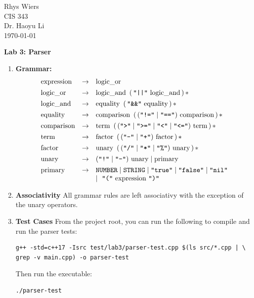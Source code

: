 \documentclass[12pt]{article}
\theoremstyle{definition}
\newcommand{\term}[1]{\texttt{"#1"}}
\newcommand{\nt}[1]{\text{#1}}
\begin{document}
    \noindent
    Rhys Wiers\\
    CIS 343\\
    Dr. Haoyu Li\\
    \today

    \begin{center}
        {\Large \textbf{Lab 3: Parser}}
    \end{center}

    \begin{enumerate}
    \item \textbf{Grammar:}
        \begin{equation*}
        \begin{array}{lcl}
        \nt{expression} & \rightarrow & \nt{logic\_or} \\[4pt]
        \nt{logic\_or}  & \rightarrow & \nt{logic\_and}\ \left(\,\term{\textbar\textbar}\ \nt{logic\_and}\,\right)* \\[4pt]
        \nt{logic\_and} & \rightarrow & \nt{equality}\ \left(\,\term{\&\&}\ \nt{equality}\,\right)* \\[4pt]
        \nt{equality}   & \rightarrow & \nt{comparison}\ \left(\,(\term{!=} \mid \term{==})\ \nt{comparison}\,\right)* \\[4pt]
        \nt{comparison} & \rightarrow & \nt{term}\ \left(\,(\term{>} \mid \term{>=} \mid \term{<} \mid \term{<=})\ \nt{term}\,\right)* \\[4pt]
        \nt{term}       & \rightarrow & \nt{factor}\ \left(\,(\term{-} \mid \term{+})\ \nt{factor}\,\right)* \\[4pt]
        \nt{factor}     & \rightarrow & \nt{unary}\ \left(\,(\term{/} \mid \term{*} \mid \term{\%})\ \nt{unary}\,\right)* \\[4pt]
        \nt{unary}      & \rightarrow & (\term{!} \mid \term{-})\ \nt{unary} \mid \nt{primary} \\[4pt]
        \nt{primary}    & \rightarrow & \texttt{NUMBER} \mid \texttt{STRING} \mid \term{true} \mid \term{false} \mid \term{nil} \\
                        &             & \mid\ \term{(}\ \nt{expression}\ \term{)}
        \end{array}
        \end{equation*}

    \item \textbf{Associativity}
        All grammar rules are left associativy with the exception of the unary operators.

    \item \textbf{Test Cases}
        From the project root, you can run the following to compile and run the parser tests:
        \begin{verbatim}
g++ -std=c++17 -Isrc test/lab3/parser-test.cpp $(ls src/*.cpp | \
grep -v main.cpp) -o parser-test
        \end{verbatim}
        Then run the executable:
        \begin{verbatim}
./parser-test
        \end{verbatim}


\end{enumerate}
\end{document}

